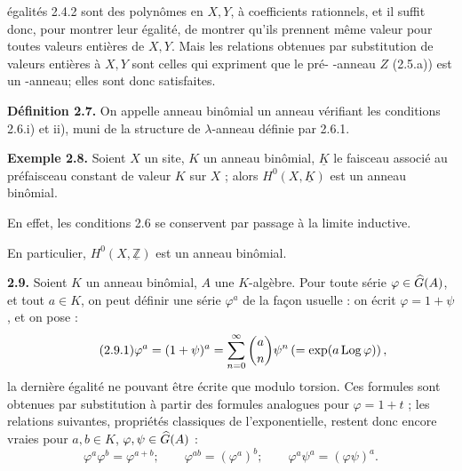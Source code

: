 égalités 2.4.2 sont des polynômes en \(X,Y\), à coefficients rationnels, et il suffit donc, pour montrer leur égalité, de montrer qu'ils prennent même valeur pour toutes valeurs entières de \(X,Y\). Mais les relations obtenues par substitution de valeurs entières à \(X,Y\) sont celles qui expriment que le pré- -anneau \(Z\) (2.5.a)) est un -anneau; elles sont donc satisfaites.

\textbf{Définition 2.7.} On appelle anneau binômial un anneau vérifiant les conditions 2.6.i) et ii), muni de la structure de \(\lambda\)-anneau définie par 2.6.1.

\textbf{Exemple 2.8.} Soient \(X\) un site, \(K\) un anneau binômial, \(\underline{K}\) le faisceau associé au préfaisceau constant de valeur \(K\) sur \(X\) ; alors \(H^0(X,\underline{K})\) est un anneau binômial.

En effet, les conditions 2.6 se conservent par passage à la limite inductive.

En particulier, \(H^0(X,\underline{\mathbb Z})\) est un anneau binômial.

\textbf{2.9.} Soient \(K\) un anneau binômial, \(A\) une \(K\)-algèbre. Pour toute série \(\varphi\in\Ghat(A)\), et tout \(a\in K\), on peut définir une série \(\varphi^a\) de la façon usuelle : on écrit \(\varphi=1+\psi\), et on pose :
\begin{equation}\tag{2.9.1}
  \varphi^a=(1+\psi)^a
  =
  \sum_{n=0}^{\infty}\binom{a}{n}\psi^n
  \left(=\exp(a\Log\varphi)\right),
\end{equation}
la dernière égalité ne pouvant être écrite que modulo torsion. Ces formules sont obtenues par substitution à partir des formules analogues pour \(\varphi=1+t\) ; les relations suivantes, propriétés classiques de l'exponentielle, restent donc encore vraies pour \(a,b\in K\), \(\varphi,\psi\in\Ghat(A)\) :
\begin{equation}\tag{2.9.2}
  \varphi^a\varphi^b=\varphi^{a+b};\qquad
  \varphi^{ab}=(\varphi^a)^b;\qquad
  \varphi^a\psi^a=(\varphi\psi)^a .
\end{equation}



\providecommand{\Ghat}{\widehat G}
\providecommand{\Gg}{\widehat G_g}
\providecommand{\Gcirc}{\widehat G_{\circ}}
\providecommand{\Gnabla}{\widehat G_{\nabla}}
\providecommand{\Grhat}{\widehat{\operatorname{Gr}}}
\providecommand{\Log}{\operatorname{Log}}
\providecommand{\Fil}{\operatorname{Fil}}
\providecommand{\eps}{\varepsilon}
\renewcommand{\id}{\operatorname{id}}
\providecommand{\Sym}{\operatorname{Sym}}
\providecommand{\Mon}{\operatorname{Mon}}


